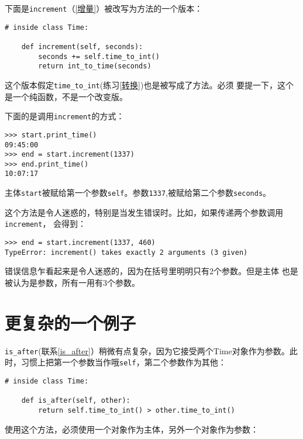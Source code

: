 下面是{\tt increment}（\ref{增量}）被改写为方法的一个版本：

\beforeverb
\begin{verbatim}
# inside class Time:

    def increment(self, seconds):
        seconds += self.time_to_int()
        return int_to_time(seconds)
\end{verbatim}
\afterverb

这个版本假定\verb"time_to_int"(练习\ref{转换})也是被写成了方法。必须
要提一下，这个是一个纯函数，不是一个改变版。

下面的是调用{\tt increment}的方式：

\beforeverb
\begin{verbatim}
>>> start.print_time()
09:45:00
>>> end = start.increment(1337)
>>> end.print_time()
10:07:17
\end{verbatim}
\afterverb

主体{\tt start}被赋给第一个参数{\tt self}。参数{\tt 1337},被赋给第二个参数{\tt seconds}。

这个方法是令人迷惑的，特别是当发生错误时。比如，如果传递两个参数调用{\tt increment}，
会得到：


\beforeverb
\begin{verbatim}
>>> end = start.increment(1337, 460)
TypeError: increment() takes exactly 2 arguments (3 given)
\end{verbatim}
\afterverb
%

错误信息乍看起来是令人迷惑的，因为在括号里明明只有2个参数。但是主体
也是被认为是参数，所有一用有3个参数。

\section{更复杂的一个例子}

\verb"is_after"(联系\ref{is_after}）稍微有点复杂，因为它接受两个Time对象作为参数。此时，习惯上把第一个参数当作哦{\tt self}，第二个参数作为其他：


\beforeverb
\begin{verbatim}
# inside class Time:

    def is_after(self, other):
        return self.time_to_int() > other.time_to_int()
\end{verbatim}
\afterverb

使用这个方法，必须使用一个对象作为主体，另外一个对象作为参数：

